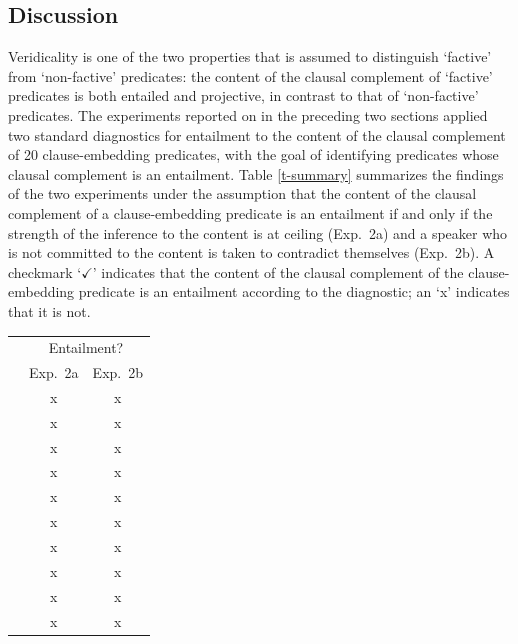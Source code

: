 \documentclass[11pt,fleqn]{article}
\newcommand{\6}{\mbox{$[\hspace*{-.6mm}[$}}
\newcommand{\9}{\mbox{$]\hspace*{-.6mm}]$}}
\begin{document}
{\subsection{Discussion}\label{s33}

Veridicality is one of the two properties that is assumed to distinguish `factive' from `non-factive' predicates: the content of the clausal complement of `factive' predicates is both entailed and projective, in contrast to that of `non-factive' predicates. The experiments reported on in the preceding two sections applied two standard diagnostics for entailment to the content of the clausal complement of 20 clause-embedding predicates, with the goal of identifying predicates whose clausal complement is an entailment. Table \ref{t-summary} summarizes the findings of the two experiments under the assumption that the content of the clausal complement of a clause-embedding predicate is an entailment if and only if the strength of the inference to the content is at ceiling (Exp.~2a) and a speaker who is not committed to the content is taken to contradict themselves (Exp.~2b). A checkmark `$\checkmark$' indicates that the content of the clausal complement of the clause-embedding predicate is an entailment according to the diagnostic; an `x' indicates that it is not.


\begin{table}[H]
\setlength\tabcolsep{3pt}

\centering
\small

\begin{tabular}{l c c}
\toprule
& \multicolumn{2}{c}{Entailment?} \\ 
& Exp.~2a & Exp.~2b \\ 

\midrule
\color{brown}{\em think}\color{black}		&  x &   x  \\ 
\color{brown}{\em pretend}\color{black}	&    x  &   x  \\ 

\color{brown}{\em suggest}	\color{black}&    x  &   x  \\
\color{brown}{\em say}\color{black}		&    x  &   x  \\ 
\color{black}{\em announce}\color{black}	&    x  &   x  \\ 
\color{black}{\em inform}\color{black}		&    x  &   x  \\ 
\color{black}{\em confess}\color{black}		&   x  &   x  \\ 
\color{blue}{\em hear}\color{black}		&    x  &   x  \\ 
\color{blue}{\em reveal}\color{black}		&    x  &   x  \\ 
\color{airforceblue}{\em demonstrate}\color{black} &	  x  &   x  \\ 



\end{tabular}
\end{table}}
\end{document}
